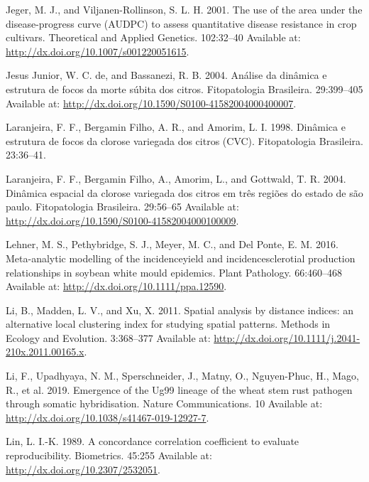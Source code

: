 \documentclass[
  letterpaper,
]{book}
\newlength{\cslhangindent}
\newlength{\cslentryspacingunit} %
\newenvironment{CSLReferences}[2] %
 {%
  \setlength{\parindent}{0pt}
  \ifodd #1
  \let\oldpar\par
  \def\par{\hangindent=\cslhangindent\oldpar}
  \fi
  \setlength{\parskip}{#2\cslentryspacingunit}
 }%
 {}
\begin{document}
\begin{CSLReferences}{0}{0}
\leavevmode{}%
Jeger, M. J., and Viljanen-Rollinson, S. L. H. 2001. The use of the area
under the disease-progress curve (AUDPC) to assess quantitative disease
resistance in crop cultivars. Theoretical and Applied Genetics.
102:32--40 Available at: \url{http://dx.doi.org/10.1007/s001220051615}.

\leavevmode{}%
Jesus Junior, W. C. de, and Bassanezi, R. B. 2004. Análise da dinâmica e
estrutura de focos da morte súbita dos citros. Fitopatologia Brasileira.
29:399--405 Available at:
\url{http://dx.doi.org/10.1590/S0100-41582004000400007}.

\leavevmode{}%
Laranjeira, F. F., Bergamin Filho, A. R., and Amorim, L. I. 1998.
Din{â}mica e estrutura de focos da clorose variegada dos citros (CVC).
Fitopatologia Brasileira. 23:36--41.

\leavevmode{}%
Laranjeira, F. F., Bergamin Filho, A., Amorim, L., and Gottwald, T. R.
2004. Dinâmica espacial da clorose variegada dos citros em três regiões
do estado de são paulo. Fitopatologia Brasileira. 29:56--65 Available
at: \url{http://dx.doi.org/10.1590/S0100-41582004000100009}.

\leavevmode{}%
Lehner, M. S., Pethybridge, S. J., Meyer, M. C., and Del Ponte, E. M.
2016. Meta{-}analytic modelling of the incidence{\textendash}yield and
incidence{\textendash}sclerotial production relationships in soybean
white mould epidemics. Plant Pathology. 66:460--468 Available at:
\url{http://dx.doi.org/10.1111/ppa.12590}.

\leavevmode{}%
Li, B., Madden, L. V., and Xu, X. 2011. Spatial analysis by distance
indices: an alternative local clustering index for studying spatial
patterns. Methods in Ecology and Evolution. 3:368--377 Available at:
\url{http://dx.doi.org/10.1111/j.2041-210x.2011.00165.x}.

\leavevmode{}%
Li, F., Upadhyaya, N. M., Sperschneider, J., Matny, O., Nguyen-Phuc, H.,
Mago, R., et al. 2019. Emergence of the Ug99 lineage of the wheat stem
rust pathogen through somatic hybridisation. Nature Communications. 10
Available at: \url{http://dx.doi.org/10.1038/s41467-019-12927-7}.

\leavevmode{}%
Lin, L. I.-K. 1989. A concordance correlation coefficient to evaluate
reproducibility. Biometrics. 45:255 Available at:
\url{http://dx.doi.org/10.2307/2532051}.


\end{CSLReferences}
\end{document}
